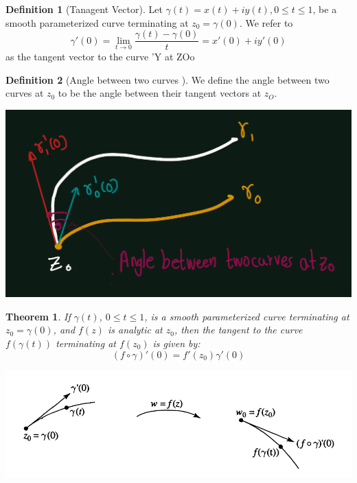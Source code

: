 \documentclass[
]{book}
\newtheorem{theorem}{Theorem}[chapter]
\theoremstyle{definition}
\newtheorem{definition}{Definition}[chapter]
\theoremstyle{definition}
\theoremstyle{definition}
\theoremstyle{definition}
\theoremstyle{remark}
\begin{document}
\begin{definition}[Tanagent Vector]
\protect\hypertarget{def:unnamed-chunk-13}{}\label{def:unnamed-chunk-13}Let \(\gamma(t) = x(t) + iy(t), 0\leq  t \leq  1\), be a smooth parameterized curve terminating at \(z_0 = \gamma(0)\). We refer to
\[\gamma'(0) = \lim_{t \to 0} \frac{\gamma(t)-\gamma(0)}{t} = x'(0) + iy'(0)\]
as the tangent vector to the curve 'Y at ZOo
\end{definition}

\begin{definition}[Angle between two curves ]
\protect\hypertarget{def:unnamed-chunk-14}{}\label{def:unnamed-chunk-14}We define the angle between two curves
at \(z_0\) to be the angle between their tangent vectors at \(z_O\).
\end{definition}

\includegraphics{figures/Confromal_mapping/fig1.png}

\begin{theorem}
\protect\hypertarget{thm:unnamed-chunk-16}{}\label{thm:unnamed-chunk-16}If \(\gamma(t)\), \(0 \leq t \leq 1\), is a smooth parameterized curve terminating at \(z_0 = \gamma(0)\), and \(f(z)\) is analytic at \(z_0\), then the tangent to the curve \(f(\gamma(t))\) terminating at \(f(z_0)\) is given by:
\begin{equation}
(f \circ \gamma)'(0) = f'(z_0)\gamma'(0)
\end{equation}
\end{theorem}

\includegraphics{figures/Confromal_mapping/fig2.png}
\end{document}
